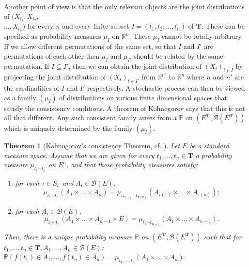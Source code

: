 \documentclass[twoside, 12pt]{book}
\numberwithin{equation}{chapter}
\newtheorem{theorem}{Theorem}[section]
\def\cB{{\mathcal B}}
\def\mP{{\mathbb P}}
\def\mR{{\mathbb R}}
\def\bT{{\mathbf T}}
\begin{document}
	Another point of view is that the only relevant objects are the joint distributions of $(X_{t_1}, X_{t_2},$ \\
	$... , X_{t_n})$ for every $n$ and every finite subset $I = (t_1, t_2, ... , t_n)$ of $\bT$. These can be specified as probability measures $\mu_{I}$ on $\mR^n$. These $\mu_{I}$ cannot be totally arbitrary. If we allow different permutations of the same set, so that $I$ and $I'$ are permutations of each other then $\mu_I$ and $\mu_{I'}$ should be related by the same permutation. If $I\subseteq I'$, then we can obtain the joint distribution of $(X_t)_{t\in I}$ by projecting the joint distribution of $(X_t)_{t\in I'}$ from $\mR^{n'}$ to $\mR^{n}$ where $n$ and $n'$ are the cardinalities of $I$ and $I'$ respectively. A stochastic process can then be viewed as a family $(\mu_I)$ of distributions on various finite dimensional spaces that satisfy the consistency conditions. A theorem of Kolmogorov says that this is not all that different. Any such consistent family arises from a $\mP$ on $(E^{{\bT}} , \cB(E^{\bT}))$ which is uniquely determined by the family $(\mu_I)$.
	\begin{theorem}[Kolmogorov's consistency Theorem, cf. \cite{Yan2021Measure}]\label{Thm:K1}
		Let $E$ be a standard measure space. Assume that we are given for every $t_1,...,t_n\in \bT$ a probability measure  $\mu_{t_1\cdots t_n}$ on $E^n$, and that these probability measures satisfy:
		\begin{enumerate}
			\item[(a).] for each $\tau\in S_n$ and $A_i \in \mathcal{B}(E)$, 
			$$
			\mu_{t_1\cdots t_n} (A_1 \times ... \times A_n)=\mu_{t_{\tau(1)}\cdots t_{\tau(n)}} (A_{\tau(1)} \times ... \times A_{\tau(n)});
			$$
			\item[(b).] for each $A_i \in \mathcal{B}(E)$, 
			$$
			\mu_{t_1\cdots t_n} (A_1 \times ... \times A_{n-1} \times E)=\mu_{t_1\cdots t_{n-1}} (A_1 \times ... \times A_{n-1}). 
			$$
		\end{enumerate}
		Then, there is a unique probability measure $\mP$ on $(E^{\bT}, \cB(E^{\bT}))$ such that for $t_1,...,t_n \in \bT, A_1,...,A_n \in \mathcal{B}(E)$: $\mP (f(t_1) \in A_1,...,f(t_n) \in A_n)=\mu_{t_1,...,t_n}(A_1 \times ... \times A_n)$. 
	\end{theorem}
	
\end{document}
